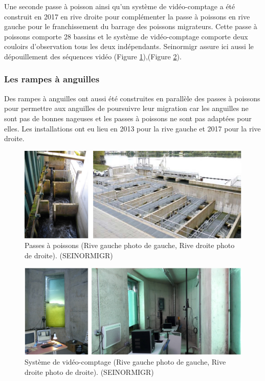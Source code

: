 \documentclass[11pt,titlepage,twoside]{article}\usepackage[]{graphicx}\usepackage[table]{xcolor}
\begin{document}
Une seconde passe à poisson ainsi qu’un système de vidéo-comptage a été construit en 2017 en rive droite pour complémenter la passe à poissons en rive gauche pour le franchissement du barrage des poissons migrateurs. Cette passe à poissons comporte 28 bassins et le système de vidéo-comptage comporte deux couloirs d’observation tous les deux indépendants. Seinormigr assure ici aussi le dépouillement des séquences vidéo (Figure \ref{RD}),(Figure \ref{RG}).

\subsubsection{Les rampes à anguilles }

Des rampes à anguilles ont aussi été construites en parallèle des passes à poissons pour permettre aux anguilles de poursuivre leur migration car les anguilles ne sont pas de bonnes nageuses et les passes à poissons ne sont pas adaptées pour elles. Les installations ont eu lieu en 2013 pour la rive gauche et 2017 pour la rive droite.

\begin{figure}[htpb]
\centering
\includegraphics[width=\textwidth]{RD}
\caption{Passes à poissons (Rive gauche photo de gauche, Rive droite photo de droite). (SEINORMIGR)}
\label{RD}
\end{figure}

\begin{figure}[htpb]
\centering
\includegraphics[width=\textwidth]{RG}
\caption{Système de vidéo-comptage (Rive gauche photo de gauche, Rive droite photo de droite). (SEINORMIGR)}
\label{RG}
\end{figure}
\end{document}

